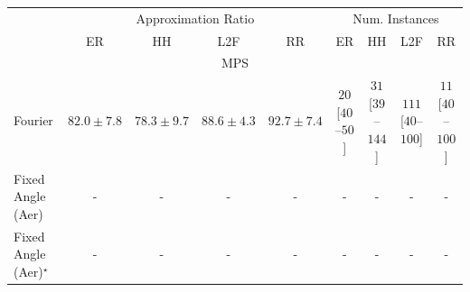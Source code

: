 \begin{tabular}{l|cccc|cccc|}
\toprule
& \multicolumn{4}{c|}{Approximation Ratio} & \multicolumn{4}{c|}{Num. Instances} \\
            & ER & HH & L2F & RR & ER & HH & L2F & RR \\
\midrule
\multicolumn{9}{c}{\rule{0pt}{8pt}MPS} \\
\midrule
Fourier & {\cellcolor[HTML]{FEECA5}} \color[HTML]{000000} $82.0\pm 7.8$ & {\cellcolor[HTML]{FFFEE1}} \color[HTML]{000000} $78.3\pm 9.7$ & {\cellcolor[HTML]{FB9326}} \color[HTML]{000000} $88.6\pm 4.3$ & {\cellcolor[HTML]{D45507}} \color[HTML]{F1F1F1} $92.7\pm 7.4$ & {\cellcolor[HTML]{FFF5F1}} \color[HTML]{000000} $20$ [$40$--$50$] & {\cellcolor[HTML]{FEF1ED}} \color[HTML]{000000} $31$ [$39$--$144$] & {\cellcolor[HTML]{FDDBD7}} \color[HTML]{000000} $111$ [$40$--$100$] & {\cellcolor[HTML]{FFF7F3}} \color[HTML]{000000} $11$ [$40$--$100$] \\
Fixed Angle (Aer) & {\cellcolor[HTML]{000000}} \color[HTML]{F1F1F1} {\cellcolor{white}} \color{black} - & {\cellcolor[HTML]{000000}} \color[HTML]{F1F1F1} {\cellcolor{white}} \color{black} - & {\cellcolor[HTML]{000000}} \color[HTML]{F1F1F1} {\cellcolor{white}} \color{black} - & {\cellcolor[HTML]{000000}} \color[HTML]{F1F1F1} {\cellcolor{white}} \color{black} - & {\cellcolor[HTML]{000000}} \color[HTML]{F1F1F1} {\cellcolor{white}} \color{black} - & {\cellcolor[HTML]{000000}} \color[HTML]{F1F1F1} {\cellcolor{white}} \color{black} - & {\cellcolor[HTML]{000000}} \color[HTML]{F1F1F1} {\cellcolor{white}} \color{black} - & {\cellcolor[HTML]{000000}} \color[HTML]{F1F1F1} {\cellcolor{white}} \color{black} - \\
Fixed Angle (Aer)$^\star$ & {\cellcolor[HTML]{000000}} \color[HTML]{F1F1F1} {\cellcolor{white}} \color{black} - & {\cellcolor[HTML]{000000}} \color[HTML]{F1F1F1} {\cellcolor{white}} \color{black} - & {\cellcolor[HTML]{000000}} \color[HTML]{F1F1F1} {\cellcolor{white}} \color{black} - & {\cellcolor[HTML]{000000}} \color[HTML]{F1F1F1} {\cellcolor{white}} \color{black} - & {\cellcolor[HTML]{000000}} \color[HTML]{F1F1F1} {\cellcolor{white}} \color{black} - & {\cellcolor[HTML]{000000}} \color[HTML]{F1F1F1} {\cellcolor{white}} \color{black} - & {\cellcolor[HTML]{000000}} \color[HTML]{F1F1F1} {\cellcolor{white}} \color{black} - & {\cellcolor[HTML]{000000}} \color[HTML]{F1F1F1} {\cellcolor{white}} \color{black} - \\

\end{tabular}
